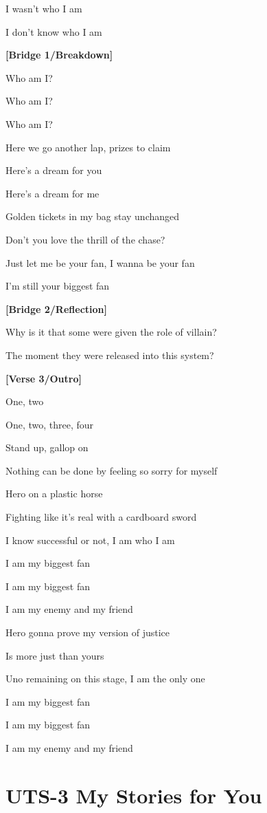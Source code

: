 \documentclass[
  letterpaper,
  DIV=11,
  numbers=noendperiod]{scrreprt}
\begin{document}
I wasn't who I am

I don't know who I am

\textbf{{[}Bridge 1/Breakdown{]}}

Who am I?

Who am I?

Who am I?

Here we go another lap, prizes to claim

Here's a dream for you

Here's a dream for me

Golden tickets in my bag stay unchanged

Don't you love the thrill of the chase?

Just let me be your fan, I wanna be your fan

I'm still your biggest fan

\textbf{{[}Bridge 2/Reflection{]}}

Why is it that some were given the role of villain?

The moment they were released into this system?

\textbf{{[}Verse 3/Outro{]}}

One, two

One, two, three, four

Stand up, gallop on

Nothing can be done by feeling so sorry for myself

Hero on a plastic horse

Fighting like it's real with a cardboard sword

I know successful or not, I am who I am

I am my biggest fan

I am my biggest fan

I am my enemy and my friend

Hero gonna prove my version of justice

Is more just than yours

Uno remaining on this stage, I am the only one

I am my biggest fan

I am my biggest fan

I am my enemy and my friend


\chapter{UTS-3 My Stories for You}\label{uts-3-my-stories-for-you}
\end{document}
